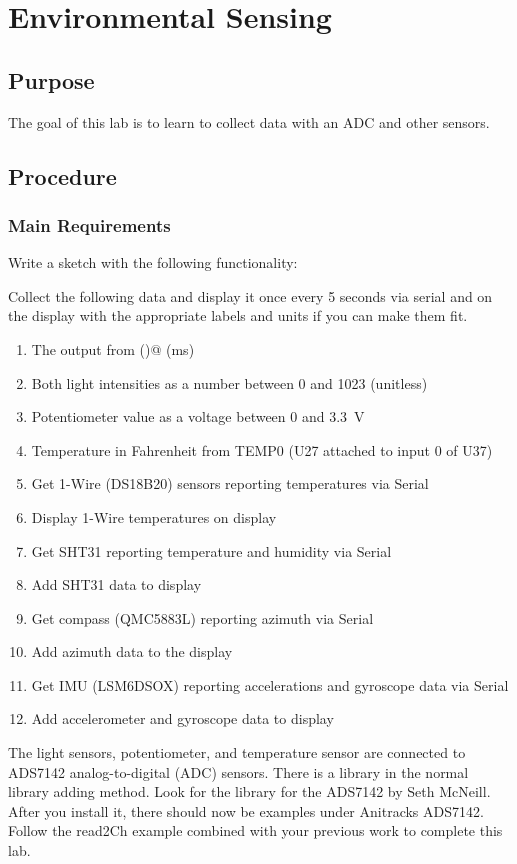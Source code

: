 \chapter{Environmental Sensing}

\section{Purpose}
The goal of this lab is to learn to collect data with an ADC and other sensors.

\section{Procedure}
\subsection{Main Requirements}
Write a sketch with the following functionality:

Collect the following data and display it once every 5 seconds via serial and on the display with the 
appropriate labels and units if you can make them fit.
\begin{enumerate}
	\item The output from \lstinline@millis()@ (ms)
	\item Both light intensities as a number between 0 and 1023 (unitless)
	\item Potentiometer value as a voltage between 0 and 3.3~V
	\item Temperature in Fahrenheit from TEMP0 (U27 attached to input 0 of U37)
    \item Get 1-Wire (DS18B20) sensors reporting temperatures via Serial
    \item Display 1-Wire temperatures on display
    \item Get SHT31 reporting temperature and humidity via Serial
    \item Add SHT31 data to display 
    \item Get compass (QMC5883L) reporting azimuth via Serial
    \item Add azimuth data to the display
    \item Get IMU (LSM6DSOX) reporting accelerations and gyroscope data via Serial 
    \item Add accelerometer and gyroscope data to display
\end{enumerate}

The light sensors, potentiometer, and temperature sensor are connected to ADS7142 
analog-to-digital (ADC) sensors. There is a library in the normal library adding 
method. Look for the library for the ADS7142 by Seth McNeill. After you install it,
there should now be examples under Anitracks ADS7142. Follow the read2Ch example 
combined with your previous work to complete this lab.

